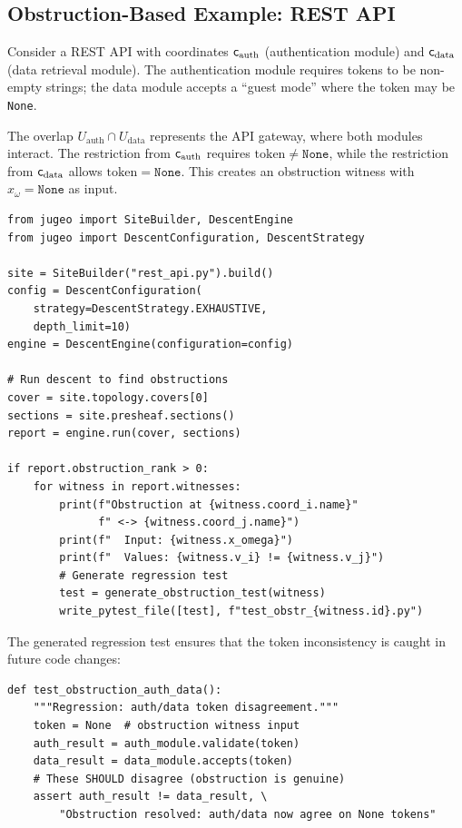 \documentclass[11pt]{article}
\begin{document}
\subsection{Obstruction-Based Example: REST API}\label{sec:obstr-example}

\begin{example}\label{ex:api-obstr}
Consider a REST API with coordinates $\mathsf{c}_{\mathrm{auth}}$ (authentication
module) and $\mathsf{c}_{\mathrm{data}}$ (data retrieval module).  The
authentication module requires tokens to be non-empty strings; the data
module accepts a ``guest mode'' where the token may be \texttt{None}.

The overlap $U_{\mathrm{auth}} \cap U_{\mathrm{data}}$ represents the
API gateway, where both modules interact.  The restriction from
$\mathsf{c}_{\mathrm{auth}}$ requires $\mathrm{token} \neq \texttt{None}$,
while the restriction from $\mathsf{c}_{\mathrm{data}}$ allows
$\mathrm{token} = \texttt{None}$.  This creates an obstruction witness
with $x_\omega = \texttt{None}$ as input.

\begin{lstlisting}[style=jugeo-python]
from jugeo import SiteBuilder, DescentEngine
from jugeo import DescentConfiguration, DescentStrategy

site = SiteBuilder("rest_api.py").build()
config = DescentConfiguration(
    strategy=DescentStrategy.EXHAUSTIVE,
    depth_limit=10)
engine = DescentEngine(configuration=config)

# Run descent to find obstructions
cover = site.topology.covers[0]
sections = site.presheaf.sections()
report = engine.run(cover, sections)

if report.obstruction_rank > 0:
    for witness in report.witnesses:
        print(f"Obstruction at {witness.coord_i.name}"
              f" <-> {witness.coord_j.name}")
        print(f"  Input: {witness.x_omega}")
        print(f"  Values: {witness.v_i} != {witness.v_j}")
        # Generate regression test
        test = generate_obstruction_test(witness)
        write_pytest_file([test], f"test_obstr_{witness.id}.py")
\end{lstlisting}

The generated regression test ensures that the token inconsistency is
caught in future code changes:
\begin{lstlisting}[style=jugeo-python]
def test_obstruction_auth_data():
    """Regression: auth/data token disagreement."""
    token = None  # obstruction witness input
    auth_result = auth_module.validate(token)
    data_result = data_module.accepts(token)
    # These SHOULD disagree (obstruction is genuine)
    assert auth_result != data_result, \
        "Obstruction resolved: auth/data now agree on None tokens"
\end{lstlisting}
\end{example}
\end{document}
